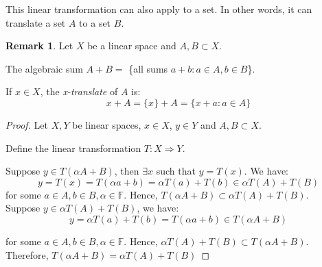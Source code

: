 \documentclass[12pt, reqno]{amsart}
\theoremstyle{definition}
\newtheorem{example}[theorem]{Example}
\newtheorem{remark}[theorem]{Remark}
\numberwithin{equation}{section}
\newcommand{\dF}{{\mathbb F}}
\begin{document}
This linear transformation can also apply to a set. In other words, it can translate a set $A$ to a set $B$.

    \begin{remark} 
        Let $X$ be a linear space and $A, B \subset X$. 
        
        The algebraic sum $A+B =$ \{all sums $a+b : a \in A, b \in B$\}. 
        
        If $x \in X$, the \textit{x-translate} of $A$ is:
        $$x+A = \{x\}+A = \{x+a : a \in A\}$$
    \end{remark}
        
    \begin{proof}
        Let $X, Y$ be linear spaces, $x \in X$, $y \in Y$ and $A, B \subset X$. 
        
        Define the linear transformation $T: X \Longrightarrow Y$.
        
        Suppose $y \in T(\alpha A+B)$, then $\exists x$ such that $y=T(x)$. We have:
        $$
        y= T(x)=T(\alpha a+ b)= \alpha T(a) + T(b)
        \in \alpha T( A) +T(B)
        $$
        for some $a \in A, b \in B, \alpha \in \dF$. Hence, $T(\alpha A+B) \subset \alpha T( A) +T(B)$.\\
        
        Suppose $y \in \alpha T(A) +T(B)$, we have:
        $$y = \alpha T(a)+ T(b) = T(\alpha a +b) \in T(\alpha A+B)$$
        
        for some $a \in A, b \in B, \alpha \in \dF$. Hence, $\alpha T( A) +T(B) \subset T(\alpha A+B) $. Therefore, ${T(\alpha A+B) = \alpha T( A) +T(B)}$
    \end{proof}
\begin{comment}
\begin{example}
    Consider the vector space \( P \) of all polynomials with real coefficients. Define the linear transformation \( T: P \to P \) by:
    $$
    T(p(x)) = p'(x),
    $$
    where \( p'(x) \) is the derivative of \( p(x) \). For example, if \( p(x) = 2 + 3x + 4x^2 \), then:
    $$
    T(p(x)) = p'(x) = 3 + 8x.
    $$

    This transformation is linear because it satisfies:
    \begin{enumerate}
        \item \( T(p_1(x) + p_2(x)) = T(p_1(x)) + T(p_2(x)) \) (the derivative of a sum is the sum of the derivatives).
        \item \( T(\alpha \cdot p(x)) = \alpha \cdot T(p(x)) \) for any scalar \( \alpha \) (the derivative of a scalar multiple is the scalar multiple of the derivative).
    \end{enumerate}

    Note that \( P \) is an infinite-dimensional vector space, as no finite subset of the standard basis \( \{1, x, x^2, x^3, \dots\} \) can span \( P \). Thus, this provides an example of a linear transformation on an infinite-dimensional linear space.
\end{example}    
\end{comment}    
\end{document}
